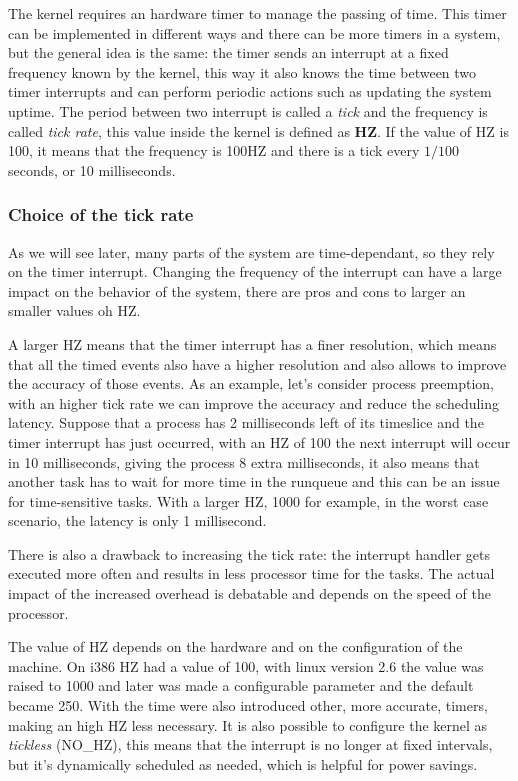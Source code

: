 The kernel requires an hardware timer to manage the passing of time. This timer can be implemented in different ways and there can be more timers in a system, but the general idea is the same: the timer sends an interrupt at a fixed frequency known by the kernel, this way it also knows the time between two timer interrupts and can perform periodic actions such as updating the system uptime. The period between two interrupt is called a \textit{tick} and the frequency is called \textit{tick rate}, this value inside the kernel is defined as \textbf{HZ}. If the value of HZ is 100, it means that the frequency is 100HZ and there is a tick every $1/100$ seconds, or 10 milliseconds.

\subsubsection{Choice of the tick rate}
As we will see later, many parts of the system are time-dependant, so they rely on the timer interrupt. Changing the frequency of the interrupt can have a large impact on the behavior of the system, there are pros and cons to larger an smaller values oh HZ.

A larger HZ means that the timer interrupt has a finer resolution, which means that all the timed events also have a higher resolution and also allows to improve the accuracy of those events. As an example, let's consider process preemption, with an higher tick rate we can improve the accuracy and reduce the scheduling latency. Suppose that a process has 2 milliseconds left of its timeslice and the timer interrupt has just occurred, with an HZ of 100 the next interrupt will occur in 10 milliseconds, giving the process 8 extra milliseconds, it also means that another task has to wait for more time in the runqueue and this can be an issue for time-sensitive tasks. With a larger HZ, 1000 for example, in the worst case scenario, the latency is only 1 millisecond.

There is also a drawback to increasing the tick rate: the interrupt handler gets executed more often and results in less processor time for the tasks. The actual impact of the increased overhead is debatable and depends on the speed of the processor.

The value of HZ depends on the hardware and on the configuration of the machine. On i386 HZ had a value of 100, with linux version 2.6 the value was raised to 1000 and later was made a configurable parameter and the default became 250. With the time were also introduced other, more accurate, timers, making an high HZ less necessary. It is also possible to configure the kernel as \textit{tickless} (NO\_HZ), this means that the interrupt is no longer at fixed intervals, but it's dynamically scheduled as needed, which is helpful for power savings.


